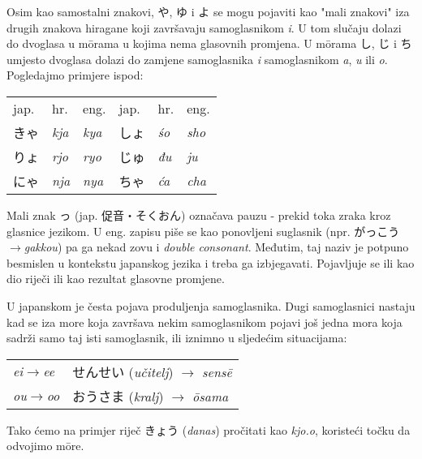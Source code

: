 	
	Osim kao samostalni znakovi, や, ゆ i よ se mogu pojaviti kao "mali znakovi" iza drugih znakova hiragane koji završavaju samoglasnikom \textit{i}. U tom slučaju dolazi do dvoglasa\footnotemark[3] u m\={o}rama u kojima nema glasovnih promjena. U m\={o}rama し, じ i ち umjesto dvoglasa dolazi do zamjene samoglasnika \textit{i} samoglasnikom \textit{a}, \textit{u} ili \textit{o}. Pogledajmo primjere ispod:
	
	\begin{tabular}{l l l | l l l}
		jap.&hr.&eng.&jap.&hr.&eng.\\
		きゃ&\textit{kja}&\textit{kya}&しょ&\textit{\'{s}o}&\textit{sho}\\
		りょ&\textit{rjo}&\textit{ryo}&じゅ&\textit{đu}&\textit{ju}\\
		にゃ&\textit{nja}&\textit{nya}&ちゃ&\textit{ća}&\textit{cha}\\
	\end{tabular}

	
	Mali znak っ (jap. 促音・そくおん) označava pauzu - prekid toka zraka kroz glasnice jezikom. U eng. zapisu piše se kao ponovljeni suglasnik (npr. がっこう$\rightarrow$\textit{gakkou}) pa ga nekad zovu i \textit{double consonant}. Međutim, taj naziv je potpuno besmislen u kontekstu japanskog jezika i treba ga izbjegavati. Pojavljuje se ili kao dio riječi ili kao rezultat glasovne promjene.
	
	
	U japanskom je česta pojava produljenja samoglasnika. Dugi samoglasnici nastaju kad se iza more koja završava nekim samoglasnikom pojavi još jedna mora koja sadrži samo taj isti samoglasnik, ili iznimno u sljedećim situacijama:
	
	\vspace{5pt}
	\begin{tabular}{l l}
		\textit{ei}$\rightarrow$\textit{ee} & せんせい (\textit{učitelj}) $\rightarrow$ \textit{sens\={e}}\\
		\textit{ou}$\rightarrow$\textit{oo} & おうさま (\textit{kralj}) $\rightarrow$ \textit{\={o}sama}\\
	\end{tabular}

	\vspace{5pt}
	Tako ćemo na primjer riječ きょう (\textit{danas}) pročitati kao \textit{kjo.o}, koristeći točku da odvojimo m\={o}re.
	
